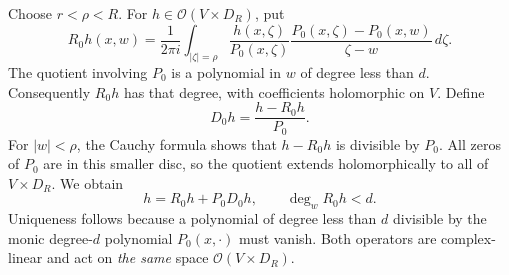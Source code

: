 \documentclass[11pt]{article}
\theoremstyle{definition}
\newcommand{\OO}{\mathcal O}
\begin{document}
Choose $r<\rho<R$. For $h\in\OO(V\times D_R)$, put
\begin{equation}\label{eq:ordinaryR}
 R_0h(x,w)=\frac1{2\pi i}\int_{|\zeta|=\rho}
 \frac{h(x,\zeta)}{P_0(x,\zeta)}
 \frac{P_0(x,\zeta)-P_0(x,w)}{\zeta-w}\,d\zeta.
\end{equation}
The quotient involving $P_0$ is a polynomial in $w$ of degree less than $d$. Consequently $R_0h$ has that degree, with coefficients holomorphic on $V$. Define
\begin{equation}\label{eq:ordinaryD}
 D_0h=\frac{h-R_0h}{P_0}.
\end{equation}
For $|w|<\rho$, the Cauchy formula shows that $h-R_0h$ is divisible by $P_0$. All zeros of $P_0$ are in this smaller disc, so the quotient extends holomorphically to all of $V\times D_R$. We obtain
\begin{equation}\label{eq:ordinarydivision}
 h=R_0h+P_0D_0h,\qquad \deg_wR_0h<d.
\end{equation}
Uniqueness follows because a polynomial of degree less than $d$ divisible by the monic degree-$d$ polynomial $P_0(x,\cdot)$ must vanish. Both operators are complex-linear and act on \emph{the same} space $\OO(V\times D_R)$.
\end{document}
